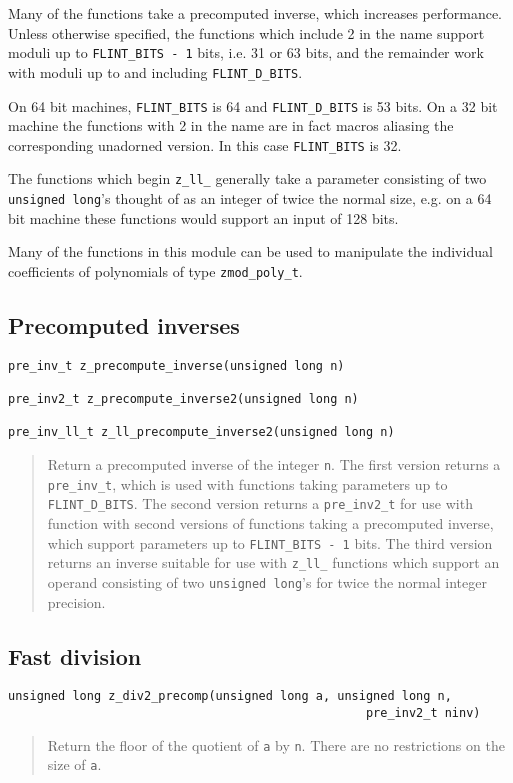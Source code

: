 \documentclass[a4paper,10pt]{article}
\newcommand{\code}{\lstinline}
\begin{document}
Many of the functions take a precomputed inverse, which increases performance. Unless otherwise specified, the functions which include 2 in the name support moduli up to \code{FLINT_BITS - 1} bits, i.e. 31 or 63 bits, and the remainder work with moduli up to and including \code{FLINT_D_BITS}. 

On 64 bit machines, \code{FLINT_BITS} is 64 and \code{FLINT_D_BITS} is 53 bits. On a 32 bit machine the functions with 2 in the name are in fact macros aliasing the corresponding unadorned version. In this case \code{FLINT_BITS} is 32.

The functions which begin \code{z_ll_} generally take a parameter consisting of two \code{unsigned long}'s thought of as an integer of twice the normal size, e.g. on a 64 bit machine these functions would support an input of 128 bits.

Many of the functions in this module can be used to manipulate the individual coefficients of polynomials of type \code{zmod_poly_t}.

\subsection{Precomputed inverses}

\begin{lstlisting}
pre_inv_t z_precompute_inverse(unsigned long n)

pre_inv2_t z_precompute_inverse2(unsigned long n)

pre_inv_ll_t z_ll_precompute_inverse2(unsigned long n)
\end{lstlisting}
\begin{quote}
Return a precomputed inverse of the integer \code{n}. The first version returns a \code{pre_inv_t}, which is used with functions taking parameters up to \code{FLINT_D_BITS}. The second version returns a \code{pre_inv2_t} for use with function with second versions of functions taking a precomputed inverse, which support parameters up to \code{FLINT_BITS - 1} bits. The third version returns an inverse suitable for use with \code{z_ll_} functions which support an operand consisting of two \code{unsigned long}'s for twice the normal integer precision.
\end{quote}

\subsection{Fast division}

\begin{lstlisting}
unsigned long z_div2_precomp(unsigned long a, unsigned long n, 
                                                  pre_inv2_t ninv)
\end{lstlisting}
\begin{quote}
Return the floor of the quotient of \code{a} by \code{n}. There are no restrictions on the size of \code{a}.
\end{quote}
\end{document}
